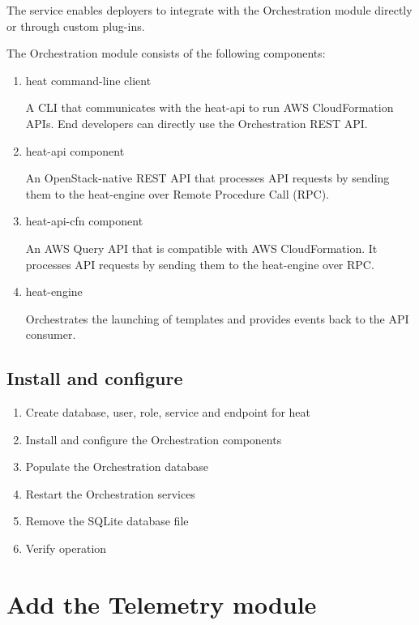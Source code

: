     \par The service enables deployers to integrate with the Orchestration module directly or through custom plug-ins.

    \par The Orchestration module consists of the following components:

    \begin{enumerate}
        \item heat command-line client
        \par A CLI that communicates with the heat-api to run AWS CloudFormation APIs. End developers can directly use the Orchestration REST API.

        \item heat-api component
        \par An OpenStack-native REST API that processes API requests by sending them to the heat-engine over Remote Procedure Call (RPC).

        \item heat-api-cfn component
        \par An AWS Query API that is compatible with AWS CloudFormation. It processes API requests by sending them to the heat-engine over RPC.

        \item heat-engine
        \par Orchestrates the launching of templates and provides events back to the API consumer.
    \end{enumerate}
    \subsection{Install and configure}
        \begin{enumerate}
            \item Create database, user, role, service and endpoint for heat
            \item Install and configure the Orchestration components
            \item Populate the Orchestration database
            \item Restart the Orchestration services
            \item Remove the SQLite database file
            \item Verify operation
        \end{enumerate}


\section{Add the Telemetry module}
    
